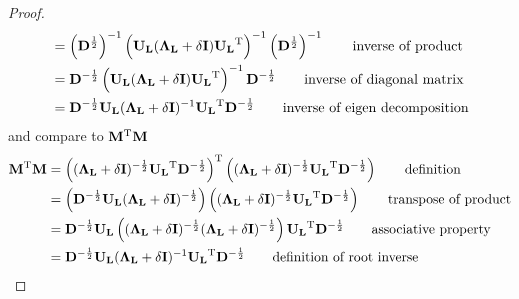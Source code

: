 \begin{proof}
\begin{align}
    	&= \left( \bD\halfpow \right)\inv \left( \bUL (\bLL + \delta \bI) \bUL\T \right)\inv \left( \bD\halfpow \right)\inv     \tag*{inverse of product}\\
    	&= \bD\neghalfpow \left( \bUL (\bLL + \delta \bI) \bUL\T \right)\inv \bD\neghalfpow    									\tag*{inverse of diagonal matrix}\\
    	&= \bD\neghalfpow \bUL (\bLL + \delta \bI)\inv \bUL\T  \bD\neghalfpow               									\tag*{inverse of eigen decomposition}
\end{align}
and compare to $\bM\T \bM$
\begin{align}
\bM \T \bM 	&= \left((\bLL + \delta \bI)\neghalfpow \bUL\T \bD\neghalfpow 	\right)\T   \left((\bLL + \delta \bI)\neghalfpow \bUL\T \bD\neghalfpow	\right) 	\tag*{definition}\\
			&= \left(\bD\neghalfpow \bUL (\bLL + \delta \bI)\neghalfpow 	\right)  \left((\bLL + \delta \bI)\neghalfpow \bUL\T \bD\neghalfpow		\right)		\tag*{transpose of product}\\
			&= \bD\neghalfpow \bUL \left( (\bLL + \delta \bI)\neghalfpow 	(\bLL + \delta \bI)\neghalfpow \right)	\bUL\T \bD\neghalfpow						\tag*{associative property}\\
			&= \bD\neghalfpow \bUL (\bLL + \delta \bI)\inv \bUL\T \bD\neghalfpow																				\tag*{definition of root inverse}
\end{align}
\end{proof}

